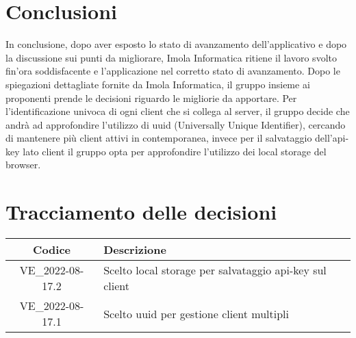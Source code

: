 \section{Conclusioni}
In conclusione, dopo aver esposto lo stato di avanzamento dell'applicativo e dopo la discussione sui punti da migliorare, Imola Informatica ritiene il lavoro svolto fin'ora soddisfacente e l'applicazione nel corretto stato di avanzamento. Dopo le spiegazioni dettagliate fornite da Imola Informatica, il gruppo insieme ai proponenti prende le decisioni riguardo le migliorie da apportare. Per l'identificazione univoca di ogni client che si collega al server, il gruppo decide che andrà ad approfondire l'utilizzo di uuid (Universally Unique Identifier), cercando di mantenere più client attivi in contemporanea, invece per il salvataggio dell'api-key lato client il gruppo opta per approfondire l'utilizzo dei local storage del browser. 
\newpage

\section*{Tracciamento delle decisioni}
	\renewcommand{\arraystretch}{1.8} %
	\begin{tabular}{ |c|l| }
		\hline
		\textbf{Codice} & \textbf{Descrizione} \\
		\hline
		VE\_2022-08-17.2 & Scelto local storage per salvataggio api-key sul client\\
		\hline
		VE\_2022-08-17.1 & Scelto uuid per gestione client multipli \\
		\hline
	\end{tabular}